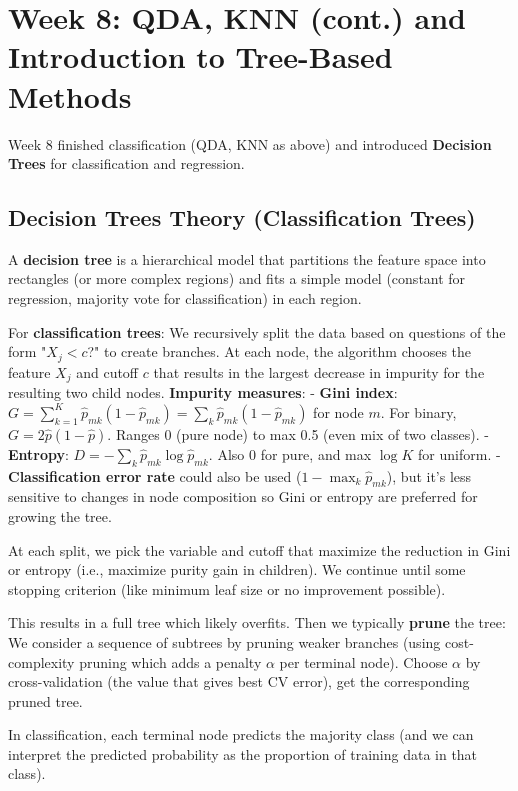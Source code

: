 \documentclass[11pt]{article}
\begin{document}
\section{Week 8: QDA, KNN (cont.) and Introduction to Tree-Based Methods}
Week 8 finished classification (QDA, KNN as above) and introduced \textbf{Decision Trees} for classification and regression.

\subsection{Decision Trees Theory (Classification Trees)}
A \textbf{decision tree} is a hierarchical model that partitions the feature space into rectangles (or more complex regions) and fits a simple model (constant for regression, majority vote for classification) in each region.

For \textbf{classification trees}: 
We recursively split the data based on questions of the form "$X_j < c$?" to create branches. At each node, the algorithm chooses the feature $X_j$ and cutoff $c$ that results in the largest decrease in impurity for the resulting two child nodes. \textbf{Impurity measures}:
- \textbf{Gini index}: $G = \sum_{k=1}^K \hat p_{mk}(1 - \hat p_{mk}) = \sum_k \hat p_{mk}(1 - \hat p_{mk})$ for node $m$. For binary, $G = 2 \hat p(1-\hat p)$. Ranges 0 (pure node) to max 0.5 (even mix of two classes).
- \textbf{Entropy}: $D = -\sum_{k} \hat p_{mk}\log \hat p_{mk}$. Also 0 for pure, and max $\log K$ for uniform.
- \textbf{Classification error rate} could also be used ($1 - \max_k \hat p_{mk}$), but it's less sensitive to changes in node composition so Gini or entropy are preferred for growing the tree.

At each split, we pick the variable and cutoff that maximize the reduction in Gini or entropy (i.e., maximize purity gain in children). We continue until some stopping criterion (like minimum leaf size or no improvement possible).

This results in a full tree which likely overfits. Then we typically \textbf{prune} the tree:
We consider a sequence of subtrees by pruning weaker branches (using cost-complexity pruning which adds a penalty $\alpha$ per terminal node). Choose $\alpha$ by cross-validation (the value that gives best CV error), get the corresponding pruned tree.

In classification, each terminal node predicts the majority class (and we can interpret the predicted probability as the proportion of training data in that class).
\end{document}
